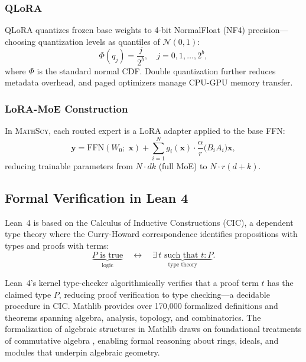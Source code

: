 \documentclass[11pt,a4paper]{article}
\newcommand{\mathscy}{\textsc{MathScy}}
\begin{document}
\subsubsection{QLoRA}

QLoRA \citep{dettmers2023qlora} quantizes frozen base weights to 4-bit NormalFloat (NF4) precision---choosing quantization levels as quantiles of $\mathcal{N}(0, 1)$:
\begin{equation}
    \Phi(q_j) = \frac{j}{2^b}, \quad j = 0, 1, \ldots, 2^b,
\end{equation}
where $\Phi$ is the standard normal CDF. Double quantization further reduces metadata overhead, and paged optimizers manage CPU-GPU memory transfer.

\subsubsection{LoRA-MoE Construction}

In \mathscy{}, each routed expert is a LoRA adapter applied to the base FFN:
\begin{equation}\label{eq:lora_moe}
    \mathbf{y} = \mathrm{FFN}(W_0;\; \mathbf{x}) + \sum_{i=1}^{N} g_i(\mathbf{x}) \cdot \frac{\alpha}{r} \bigl(B_i A_i\bigr) \mathbf{x},
\end{equation}
reducing trainable parameters from $N \cdot dk$ (full MoE) to $N \cdot r(d+k)$.

\subsection{Formal Verification in Lean 4}

Lean~4 \citep{moura2021lean} is based on the Calculus of Inductive Constructions (CIC), a dependent type theory where the Curry-Howard correspondence identifies propositions with types and proofs with terms:
\begin{equation}
    \underbrace{P \text{ is true}}_{\text{logic}} \quad \longleftrightarrow \quad \underbrace{\exists\, t \text{ such that } t : P}_{\text{type theory}}.
\end{equation}

Lean~4's kernel type-checker algorithmically verifies that a proof term $t$ has the claimed type $P$, reducing proof verification to type checking---a decidable procedure in CIC. Mathlib \citep{mathlib2020} provides over 170,000 formalized definitions and theorems spanning algebra, analysis, topology, and combinatorics. The formalization of algebraic structures in Mathlib draws on foundational treatments of commutative algebra \citep{eisenbud1995commutative}, enabling formal reasoning about rings, ideals, and modules that underpin algebraic geometry.
\end{document}
